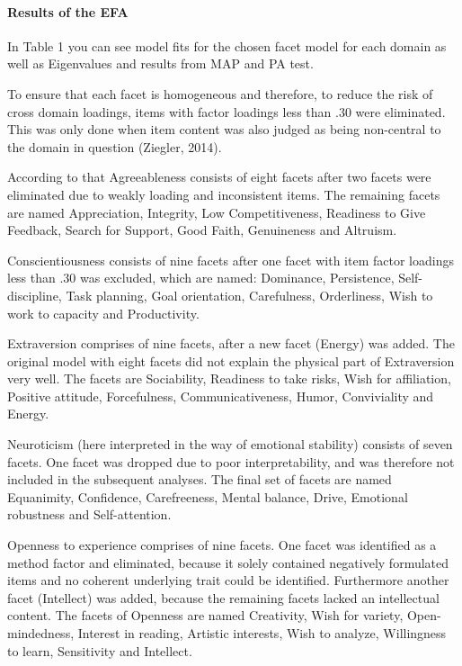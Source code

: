 \documentclass[,man]{apa6}
\let\oldparagraph\paragraph
\renewcommand{\paragraph}[1]{\oldparagraph{#1}\mbox{}}
\theoremstyle{definition}
\theoremstyle{definition}
\theoremstyle{definition}
\theoremstyle{remark}
\begin{document}
\hypertarget{results-of-the-efa}{%
\paragraph{Results of the EFA}\label{results-of-the-efa}}

In Table 1 you can see model fits for the chosen facet model for each
domain as well as Eigenvalues and results from MAP and PA test.

To ensure that each facet is homogeneous and therefore, to reduce the
risk of cross domain loadings, items with factor loadings less than .30
were eliminated. This was only done when item content was also judged as
being non-central to the domain in question (Ziegler, 2014).

According to that Agreeableness consists of eight facets after two
facets were eliminated due to weakly loading and inconsistent items. The
remaining facets are named Appreciation, Integrity, Low Competitiveness,
Readiness to Give Feedback, Search for Support, Good Faith, Genuineness
and Altruism.

Conscientiousness consists of nine facets after one facet with item
factor loadings less than .30 was excluded, which are named: Dominance,
Persistence, Self-discipline, Task planning, Goal orientation,
Carefulness, Orderliness, Wish to work to capacity and Productivity.

Extraversion comprises of nine facets, after a new facet (Energy) was
added. The original model with eight facets did not explain the physical
part of Extraversion very well. The facets are Sociability, Readiness to
take risks, Wish for affiliation, Positive attitude, Forcefulness,
Communicativeness, Humor, Conviviality and Energy.

Neuroticism (here interpreted in the way of emotional stability)
consists of seven facets. One facet was dropped due to poor
interpretability, and was therefore not included in the subsequent
analyses. The final set of facets are named Equanimity, Confidence,
Carefreeness, Mental balance, Drive, Emotional robustness and
Self-attention.

Openness to experience comprises of nine facets. One facet was
identified as a method factor and eliminated, because it solely
contained negatively formulated items and no coherent underlying trait
could be identified. Furthermore another facet (Intellect) was added,
because the remaining facets lacked an intellectual content. The facets
of Openness are named Creativity, Wish for variety, Open-mindedness,
Interest in reading, Artistic interests, Wish to analyze, Willingness to
learn, Sensitivity and Intellect.
\end{document}
